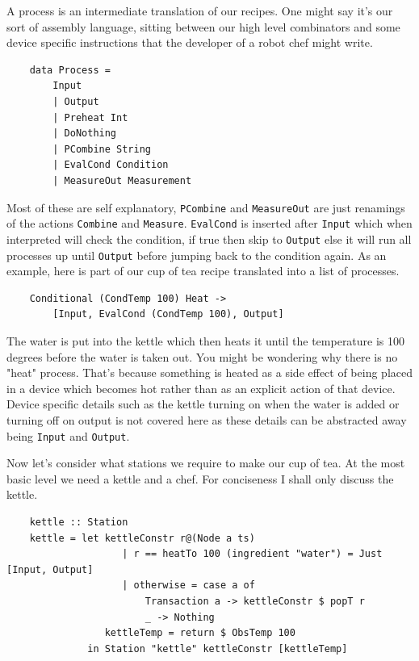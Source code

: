 \documentclass[11pt]{article}
\begin{document}
A process is an intermediate translation of our recipes. One might say it's our sort of assembly
language, sitting between our high level combinators and some device specific instructions that the
developer of a robot chef might write.

\begin{lstlisting}
    data Process =
        Input
        | Output
        | Preheat Int
        | DoNothing
        | PCombine String
        | EvalCond Condition
        | MeasureOut Measurement
\end{lstlisting}

Most of these are self explanatory, \texttt{PCombine} and \texttt{MeasureOut} are just renamings of
the actions \texttt{Combine} and \texttt{Measure}. \texttt{EvalCond} is inserted after \texttt{Input}
which when interpreted will check the condition, if true then skip to \texttt{Output} else it will
run all processes up until \texttt{Output} before jumping back to the condition again. As an example,
here is part of our cup of tea recipe translated into a list of processes.

\begin{lstlisting}
    Conditional (CondTemp 100) Heat ->
        [Input, EvalCond (CondTemp 100), Output]
\end{lstlisting}

The water is put into the kettle which then heats it until the temperature is 100 degrees
before the water is taken out. You might be wondering why there is no "heat" process.
That's because something is heated as a side effect of being placed in a device which becomes hot
rather than as an explicit action of that device. Device specific details such as the kettle turning
on when the water is added or turning off on output is not covered here as these details can
be abstracted away being \texttt{Input} and \texttt{Output}.

\medbreak

Now let's consider what stations we require to make our cup of tea. At the most basic level
we need a kettle and a chef. For conciseness I shall only discuss the kettle.

\begin{lstlisting}
    kettle :: Station
    kettle = let kettleConstr r@(Node a ts)
                    | r == heatTo 100 (ingredient "water") = Just [Input, Output]
                    | otherwise = case a of
                        Transaction a -> kettleConstr $ popT r
                        _ -> Nothing
                 kettleTemp = return $ ObsTemp 100
              in Station "kettle" kettleConstr [kettleTemp]
\end{lstlisting}
\end{document}
